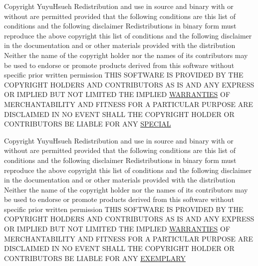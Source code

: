 \begin{DoxyCompactItemize}
\item 
Copyright Yuyu\+Hsueh Redistribution and use in source and binary with or without are permitted provided that the following conditions are this list of conditions and the following disclaimer Redistributions in binary form must reproduce the above copyright this list of conditions and the following disclaimer in the documentation and or other materials provided with the distribution Neither the name of the copyright holder nor the names of its contributors may be used to endorse or promote products derived from this software without specific prior written permission T\+H\+IS S\+O\+F\+T\+W\+A\+RE IS P\+R\+O\+V\+I\+D\+ED BY T\+HE C\+O\+P\+Y\+R\+I\+G\+HT H\+O\+L\+D\+E\+RS A\+ND C\+O\+N\+T\+R\+I\+B\+U\+T\+O\+RS AS IS A\+ND A\+NY E\+X\+P\+R\+E\+SS OR I\+M\+P\+L\+I\+ED B\+UT N\+OT L\+I\+M\+I\+T\+ED T\+HE I\+M\+P\+L\+I\+ED \hyperlink{license_8txt_a042eb66328050ad88743187ae8e43b95}{W\+A\+R\+R\+A\+N\+T\+I\+ES} OF M\+E\+R\+C\+H\+A\+N\+T\+A\+B\+I\+L\+I\+TY A\+ND F\+I\+T\+N\+E\+SS F\+OR A P\+A\+R\+T\+I\+C\+U\+L\+AR P\+U\+R\+P\+O\+SE A\+RE D\+I\+S\+C\+L\+A\+I\+M\+ED IN NO E\+V\+E\+NT S\+H\+A\+LL T\+HE C\+O\+P\+Y\+R\+I\+G\+HT H\+O\+L\+D\+ER OR C\+O\+N\+T\+R\+I\+B\+U\+T\+O\+RS BE L\+I\+A\+B\+LE F\+OR A\+NY \hyperlink{license_8txt_a910ad17f295c48bc77c8ee2434bf4ac5}{S\+P\+E\+C\+I\+AL}
\item 
Copyright Yuyu\+Hsueh Redistribution and use in source and binary with or without are permitted provided that the following conditions are this list of conditions and the following disclaimer Redistributions in binary form must reproduce the above copyright this list of conditions and the following disclaimer in the documentation and or other materials provided with the distribution Neither the name of the copyright holder nor the names of its contributors may be used to endorse or promote products derived from this software without specific prior written permission T\+H\+IS S\+O\+F\+T\+W\+A\+RE IS P\+R\+O\+V\+I\+D\+ED BY T\+HE C\+O\+P\+Y\+R\+I\+G\+HT H\+O\+L\+D\+E\+RS A\+ND C\+O\+N\+T\+R\+I\+B\+U\+T\+O\+RS AS IS A\+ND A\+NY E\+X\+P\+R\+E\+SS OR I\+M\+P\+L\+I\+ED B\+UT N\+OT L\+I\+M\+I\+T\+ED T\+HE I\+M\+P\+L\+I\+ED \hyperlink{license_8txt_a042eb66328050ad88743187ae8e43b95}{W\+A\+R\+R\+A\+N\+T\+I\+ES} OF M\+E\+R\+C\+H\+A\+N\+T\+A\+B\+I\+L\+I\+TY A\+ND F\+I\+T\+N\+E\+SS F\+OR A P\+A\+R\+T\+I\+C\+U\+L\+AR P\+U\+R\+P\+O\+SE A\+RE D\+I\+S\+C\+L\+A\+I\+M\+ED IN NO E\+V\+E\+NT S\+H\+A\+LL T\+HE C\+O\+P\+Y\+R\+I\+G\+HT H\+O\+L\+D\+ER OR C\+O\+N\+T\+R\+I\+B\+U\+T\+O\+RS BE L\+I\+A\+B\+LE F\+OR A\+NY \hyperlink{license_8txt_ac4a6acd1ced6bfbf36f00e4629d74515}{E\+X\+E\+M\+P\+L\+A\+RY}

\end{DoxyCompactItemize}
